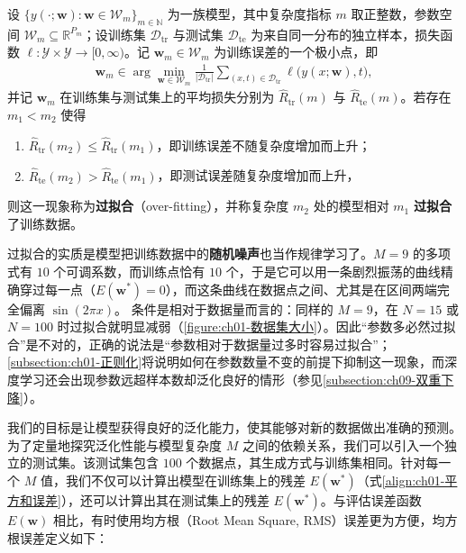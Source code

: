 \documentclass[../../main.tex]{subfiles}
\begin{document}
\begin{definition}[过拟合]\label{definition:ch01-过拟合}
设 $\{y(\cdot;\mathbf{w}):\mathbf{w}\in\mathcal{W}_{m}\}_{m\in\mathbb{N}}$ 为一族模型，其中复杂度指标 $m$ 取正整数，参数空间 $\mathcal{W}_{m}\subseteq\mathbb{R}^{P_{m}}$；设训练集 $\mathcal{D}_{\mathrm{tr}}$ 与测试集 $\mathcal{D}_{\mathrm{te}}$ 为来自同一分布的独立样本，损失函数 $\ell:\mathcal{Y}\times\mathcal{Y}\to[0,\infty)$。记 $\mathbf{w}_{m}\in\mathcal{W}_{m}$ 为训练误差的一个极小点，即
\begin{align*}
  \mathbf{w}_{m}\in\arg\min_{\mathbf{w}\in\mathcal{W}_{m}}\frac{1}{\lvert\mathcal{D}_{\mathrm{tr}}\rvert}\sum_{(x,t)\in\mathcal{D}_{\mathrm{tr}}}\ell\bigl(y(x;\mathbf{w}),t\bigr),
\end{align*}
并记 $\mathbf{w}_{m}$ 在训练集与测试集上的平均损失分别为 $\widehat{R}_{\mathrm{tr}}(m)$ 与 $\widehat{R}_{\mathrm{te}}(m)$。若存在 $m_{1}<m_{2}$ 使得
\begin{enumerate}
  \item $\widehat{R}_{\mathrm{tr}}(m_{2})\leqslant\widehat{R}_{\mathrm{tr}}(m_{1})$，即训练误差不随复杂度增加而上升；
  \item $\widehat{R}_{\mathrm{te}}(m_{2})>\widehat{R}_{\mathrm{te}}(m_{1})$，即测试误差随复杂度增加而上升，
\end{enumerate}
则这一现象称为\textbf{过拟合}（over-fitting），并称复杂度 $m_{2}$ 处的模型相对 $m_{1}$ \textbf{过拟合}了训练数据。
\end{definition}

\begin{remark}
过拟合的实质是模型把训练数据中的\textbf{随机噪声}也当作规律学习了。$M=9$ 的多项式有 $10$ 个可调系数，而训练点恰有 $10$ 个，于是它可以用一条剧烈振荡的曲线精确穿过每一点（$E(\mathbf{w}^{*})=0$），而这条曲线在数据点之间、尤其是在区间两端完全偏离 $\sin(2\pi x)$。
条件是相对于数据量而言的：同样的 $M=9$，在 $N=15$ 或 $N=100$ 时过拟合就明显减弱（\cref{figure:ch01-数据集大小}）。因此“参数多必然过拟合”是不对的，正确的说法是“参数相对于数据量过多时容易过拟合”；\cref{subsection:ch01-正则化}将说明如何在参数数量不变的前提下抑制这一现象，而深度学习还会出现参数远超样本数却泛化良好的情形（参见\cref{subsection:ch09-双重下降}）。
\end{remark}

我们的目标是让模型获得良好的泛化能力，使其能够对新的数据做出准确的预测。为了定量地探究泛化性能与模型复杂度 $M$ 之间的依赖关系，我们可以引入一个独立的测试集。该测试集包含 $100$ 个数据点，其生成方式与训练集相同。针对每一个 $M$ 值，我们不仅可以计算出模型在训练集上的残差 $E(\mathbf{w}^{*})$（式\eqref{align:ch01-平方和误差}），还可以计算出其在测试集上的残差 $E(\mathbf{w}^{*})$。与评估误差函数 $E(\mathbf{w})$ 相比，有时使用均方根（Root Mean Square, RMS）误差更为方便，均方根误差定义如下：
\end{document}
